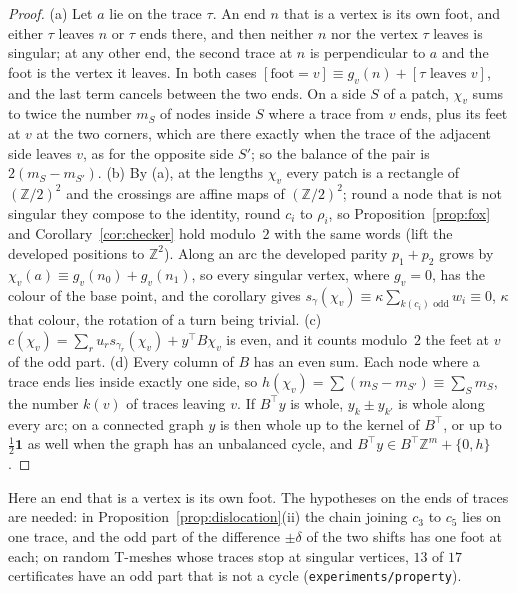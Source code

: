 \documentclass[11pt,a4paper]{article}
\newcommand{\Z}{\mathbb{Z}}
\newcommand{\shift}{s}
\begin{document}
\begin{proof}
(a) Let $a$ lie on the trace $\tau$. An end $n$ that is a vertex is its own
foot, and either $\tau$ leaves $n$ or $\tau$ ends there, and then neither $n$
nor the vertex $\tau$ leaves is singular; at any other end, the second trace at $n$
is perpendicular to $a$ and the foot is the vertex it leaves. In both cases
$[\text{foot} = v] \equiv g_v(n) + [\tau \text{ leaves } v]$, and the last term
cancels between the two ends. On a side $S$ of a patch, $\chi_v$ sums to twice
the number $m_S$ of nodes inside $S$ where a trace from $v$ ends, plus its
feet at $v$ at the two corners, which are there exactly when the trace of the
adjacent side leaves $v$, as for the opposite side $S'$; so the balance of
the pair is $2(m_S - m_{S'})$. (b) By (a), at the lengths $\chi_v$ every patch is a
rectangle of $(\Z/2)^2$ and the crossings are affine maps of $(\Z/2)^2$;
round a node that is not singular they compose to the identity, round $c_i$ to
$\rho_i$, so Proposition~\ref{prop:fox} and Corollary~\ref{cor:checker} hold
modulo~$2$ with the same words (lift the developed positions to $\Z^2$). Along
an arc the developed parity $p_1 + p_2$ grows by $\chi_v(a) \equiv g_v(n_0) +
g_v(n_1)$, so every singular vertex, where $g_v = 0$, has the colour of the
base point, and the corollary gives $\shift_\gamma(\chi_v) \equiv \kappa
\sum_{k(c_i)\text{ odd}} w_i \equiv 0$, $\kappa$ that colour, the rotation of
a turn being trivial.
(c) $c(\chi_v) = \sum_r u_r \shift_{\gamma_r}(\chi_v) + y^\top B\chi_v$ is even,
and it counts modulo~$2$ the feet at $v$ of the odd part. (d) Every column of
$B$ has an even sum. Each node where a trace ends lies inside exactly one side,
so $h(\chi_v) = \sum (m_S - m_{S'}) \equiv \sum_S m_S$, the number $k(v)$ of traces
leaving $v$. If $B^\top y$ is whole, $y_k \pm y_{k'}$ is whole along every arc;
on a connected graph $y$ is then whole up to the kernel of $B^\top$, or up to
$\frac12\mathbf 1$ as well when the graph has an unbalanced cycle, and $B^\top y
\in B^\top\Z^m + \{0, h\}$.
\end{proof}

Here an end that is a vertex is its own foot. The hypotheses on the ends of
traces are needed: in Proposition~\ref{prop:dislocation}(ii) the chain joining
$c_3$ to $c_5$ lies on one trace, and the odd part of the difference
$\pm\delta$ of the two shifts has one foot at each; on random T-meshes whose
traces stop at singular vertices, $13$ of $17$ certificates have an odd part
that is not a cycle (\texttt{experiments/property}).
\end{document}
